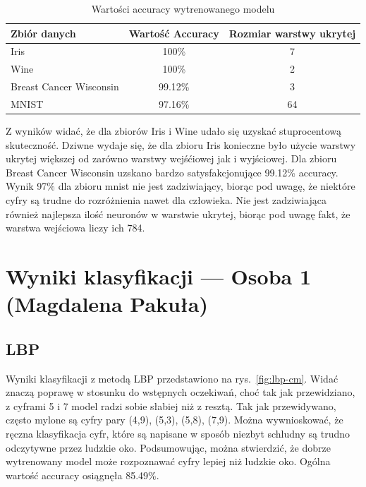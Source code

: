 \documentclass[10pt]{article}
\begin{document}
\begin{table}[H]\centering
    \begin{tabular}{lcc}
        \toprule
        Zbiór danych            & Wartość Accuracy & Rozmiar warstwy ukrytej \\
        \midrule
        Iris                    & 100\%            & 7                       \\
        Wine                    & 100\%            & 2                       \\
        Breast Cancer Wisconsin & 99.12\%          & 3                       \\
        MNIST                   & 97.16\%          & 64                      \\
        \bottomrule
    \end{tabular}
    \caption{Wartości accuracy wytrenowanego modelu}
\end{table}

Z wyników widać, że dla zbiorów Iris i Wine udało się uzyskać stuprocentową skuteczność.
Dziwne wydaje się, że dla zbioru Iris konieczne było użycie warstwy ukrytej większej od zarówno warstwy wejśćiowej jak i wyjściowej.
Dla zbioru Breast Cancer Wisconsin uzskano bardzo satysfakcjonujące 99.12\% accuracy.
Wynik 97\% dla zbioru mnist nie jest zadziwiający, biorąc pod uwagę, że niektóre cyfry są trudne do rozróżnienia nawet dla człowieka.
Nie jest zadziwiająca również najlepsza ilość neuronów w warstwie ukrytej, biorąc pod uwagę fakt, że warstwa wejściowa liczy ich 784.

\pagebreak

\section{Wyniki klasyfikacji --- Osoba 1 (Magdalena Pakuła)}
\subsection*{LBP}
Wyniki klasyfikacji z metodą LBP przedstawiono na rys.~\ref{fig:lbp-cm}.
Widać znaczą poprawę w stosunku do wstępnych oczekiwań, choć tak jak przewidziano, z cyframi 5 i 7 model radzi sobie słabiej niż z resztą.
Tak jak przewidywano, często mylone są cyfry pary (4,9), (5,3), (5,8), (7,9). Można wywnioskować, że ręczna klasyfikacja cyfr, które są napisane w sposób niezbyt schludny są trudno odczytywne przez ludzkie oko.
Podsumowując, można stwierdzić, że dobrze wytrenowany model może rozpoznawać cyfry lepiej niż ludzkie oko.
Ogólna wartość accuracy osiągnęła 85.49\%.
\end{document}

